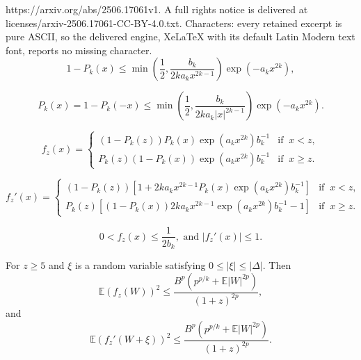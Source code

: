\documentclass[10pt,a4paper]{amsart}
\def\E{\mathbb{E}}
\begin{document}
https://arxiv.org/abs/2506.17061v1. A full rights notice is delivered at licenses/arxiv-2506.17061-CC-BY-4.0.txt. Characters: every retained excerpt is pure ASCII, so the delivered engine, XeLaTeX with its default Latin Modern text font, reports no missing character.
			\begin{equation}\label{mills.ratio1}
				1-P_k(x) \le \min \left(\frac{1}{2}, \frac{b_k}{2 k a_k x^{2 k-1}}\right) \exp \left(-a_k x^{2 k}\right),
			\end{equation}

			\begin{equation}\label{mills.ratio2}
				P_k(x)=1-P_k(-x) \le \min \left(\frac{1}{2}, \frac{b_k}{2 k a_k |x|^{2 k-1}}\right) \exp \left(-a_k x^{2 k}\right).
			\end{equation}

			\begin{equation}\label{sol03}
				f_z(x) =
				\begin{cases}
					(1-P_k(z))P_k(x)\exp({a_kx^{2k}})b_k^{-1} &\text{if }\ x < z,\\
					P_k(z)(1-P_k(x))\exp({a_kx^{2k}})b_k^{-1} &\text{if }\ x \ge z.
				\end{cases} 
			\end{equation}

			\begin{equation}\label{sol15}
				f_{z}'(x) =
				\begin{cases}
					(1-P_k(z))\left[1 + 2ka_kx^{2k-1}P_k(x)\exp({a_kx^{2k}})b_k^{-1}\right] &\text{if }\ x < z,\\
					P_k(z)\left[(1-P_k(x))2ka_kx^{2k-1}\exp({a_kx^{2k}})b_k^{-1}-1\right] &\text{if }\ x \ge  z. 
				\end{cases} 
			\end{equation}

			\begin{equation}\label{sol07}
				0 < f_z(x) \le \dfrac{1}{2b_k}, \text{ and }
				|f_{z}'(x)| \le 1.
			\end{equation}

	\begin{lemma}\label{lem.bs} 
		For $z \ge 5$ and $\xi$ is a random variable satisfying $0\le |\xi|\le |\Delta|$. Then
		\begin{equation}\label{estimate.lem1.01}
			\E(f_{z}(W))^2 \le \dfrac{B^p (p^{p/k}+\E|W|^{2p})}{(1+z)^{2p}},
		\end{equation}
		and
		\begin{equation}\label{estimate.lem1.02}
			\E(f_{z}'(W+\xi))^2 \le \dfrac{B^p (p^{p/k}+\E|W|^{2p})}{(1+z)^{2p}}.
		\end{equation}
	\end{lemma} 
\end{document}
